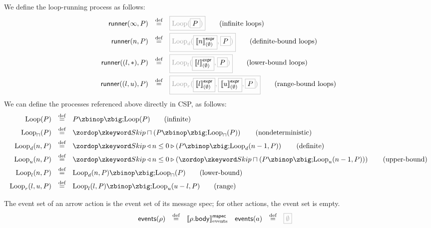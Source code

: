 \begin{definition}
We define the loop-running process as follows:
%
\begin{align*}
  \funcname{runner}(\infty, P)
  \quad\defeq\quad
  & \tlang{\iloop{\olang{P}}}
    \tag{infinite loops}
  \\
  \funcname{runner}(n, P)
  \quad\defeq\quad
  & \tlang{\dloop{\olang{\exprsema{n}{\emptyset}}}{\olang{P}}}
    \tag{definite-bound loops}
  \\
  \funcname{runner}((l, \ast), P)
  \quad\defeq\quad
  & \tlang{\lloop{\olang{\exprsema{l}{\emptyset}}}{\olang{P}}}
    \tag{lower-bound loops}
  \\
  \funcname{runner}((l, u), P)
  \quad\defeq\quad
  & \tlang{\rloop{\olang{\exprsema{l}{\emptyset}}}{\olang{\exprsema{u}{\emptyset}}}{\olang{P}}}
    \tag{range-bound loops}
  \\  
\end{align*}
%
We can define the processes referenced above directly in CSP, as follows:
%
\begin{align*}
  \iloop{P}
  \quad\defeq\quad
  & P \circseq \iloop{P}
    \tag{infinite}
  \\
  \nloop{P}
  \quad\defeq\quad
  & \Skip \intchoice \left(P \circseq \nloop{P}\right)
    \tag{nondeterministic}
  \\  
  \dloop{n}{P}
  \quad\defeq\quad
  & \Skip \triangleleft n \leq 0 \triangleright \left(P \circseq \dloop{n-1}{P}\right)
    \tag{definite}
  \\
  \uloop{n}{P}
  \quad\defeq\quad
  & \Skip \triangleleft n \leq 0 \triangleright \left(\Skip \intchoice \left(P \circseq \uloop{n-1}{P}\right)\right)
    \tag{upper-bound}
  \\
  \lloop{n}{P}
  \quad\defeq\quad
  & \dloop{n}{P} \circseq \nloop{P}
    \tag{lower-bound}
  \\
  \rloop{l}{u}{P}
  \quad\defeq\quad
  & \lloop{l}{P} \circseq \uloop{u - l}{P}
    \tag{range}
  \\
\end{align*}
\end{definition}

\begin{definition}
  The event set of an arrow action is the event set of its message spec; for
  other actions, the event set is empty.
%
  \begin{align*}
    \eventsOf{\anarrow}
    \quad\defeq\quad
    &
      \emspecsema{\field{\anarrow}{body}}
    &
      \eventsOf{\anaction}
      \quad\defeq\quad
    &
      \tlang{\emptyset}
  \end{align*}
\end{definition}

